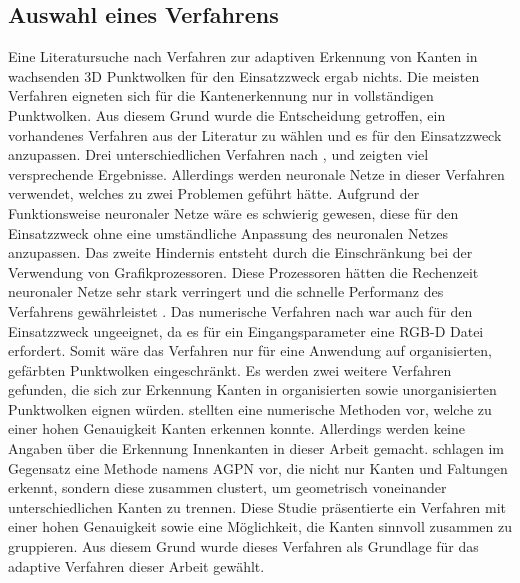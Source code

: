 \subsection{Auswahl eines Verfahrens}
Eine Literatursuche nach Verfahren zur adaptiven Erkennung von Kanten in wachsenden 3D Punktwolken für den Einsatzzweck ergab nichts. Die meisten Verfahren eigneten sich für die Kantenerkennung nur in vollständigen Punktwolken. Aus diesem Grund wurde die Entscheidung getroffen, ein vorhandenes Verfahren aus der Literatur zu wählen und es für den Einsatzzweck anzupassen. Drei unterschiedlichen Verfahren nach \textcite{bazazian_edc-net_2021}, \textcite{himeur_pcednet_2021} und \textcite{rachmadi_road_2017} zeigten viel versprechende Ergebnisse. Allerdings werden neuronale Netze in dieser Verfahren verwendet, welches zu zwei Problemen geführt hätte. Aufgrund der Funktionsweise neuronaler Netze wäre es schwierig gewesen, diese für den Einsatzzweck ohne eine umständliche Anpassung des neuronalen Netzes anzupassen. Das zweite Hindernis entsteht durch die Einschränkung bei der Verwendung von Grafikprozessoren. Diese Prozessoren hätten die Rechenzeit neuronaler Netze sehr stark verringert und die schnelle Performanz des Verfahrens gewährleistet \autocite[625]{luo_artificial_2005}. Das numerische Verfahren nach \textcite{choi_rgb-d_2013} war auch für den Einsatzzweck ungeeignet, da es für ein Eingangsparameter eine RGB-D Datei erfordert. Somit wäre das Verfahren nur für eine Anwendung auf organisierten, gefärbten Punktwolken eingeschränkt. Es werden zwei weitere Verfahren gefunden, die sich zur Erkennung Kanten in organisierten sowie unorganisierten Punktwolken eignen würden. \textcite{mineo_novel_2019} stellten eine numerische Methoden vor, welche zu einer hohen Genauigkeit Kanten erkennen konnte. Allerdings werden keine Angaben über die Erkennung Innenkanten in dieser Arbeit gemacht. \textcite{ni_edge_2016} schlagen im Gegensatz eine Methode namens AGPN vor, die nicht nur Kanten und Faltungen erkennt, sondern diese zusammen clustert, um geometrisch  voneinander unterschiedlichen Kanten zu trennen. Diese Studie präsentierte ein Verfahren mit einer hohen Genauigkeit sowie eine Möglichkeit, die Kanten sinnvoll zusammen zu gruppieren. Aus diesem Grund wurde dieses Verfahren als Grundlage für das adaptive Verfahren dieser Arbeit gewählt. %

